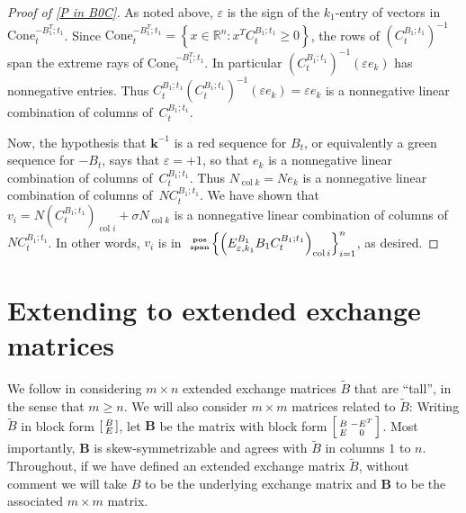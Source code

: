 \documentclass{amsart}
\theoremstyle{definition}
\theoremstyle{remark}
\numberwithin{equation}{section}
\newcommand{\reals}{\mathbb R}
\newcommand{\ep}{\varepsilon}
\newcommand{\col}{\operatorname{col}}
\newcommand{\posspan}{\!\tiny\begin{array}{c}\mathbf{pos}\\\mathbf{span}\end{array}\!\!}
\newcommand{\set}[1]{{\left\lbrace #1 \right\rbrace}}
\newcommand{\0}{{\mathbf{0}}}
\newcommand{\Cone}{\mathrm{Cone}}
\newcommand{\kk}{\mathbf{k}}
\newcommand{\tB}{{\tilde{B}}}
\newcommand{\BB}{\mathbf{B}}
\begin{document}
\begin{proof}[Proof of \cref{P in B0C}]
As noted above, $\ep$ is the sign of the $k_1$-entry of vectors in $\Cone_t^{-B_1^T;t_1}$.
Since $\Cone^{-B_1^T;t_1}_t=\set{x\in\reals^n:x^TC_t^{B_1;t_1}\ge0}$, the rows of $\left(C_t^{B_1;t_1}\right)^{-1}$ span the extreme rays of $\Cone_t^{-B_1^T;t_1}$.
In particular $\left(C_t^{B_1;t_1}\right)^{-1}(\ep e_k)$ has nonnegative entries.
Thus $C_t^{B_1;t_1}\left(C_t^{B_1;t_1}\right)^{-1}(\ep e_k)=\ep e_k$ is a nonnegative linear combination of columns of~$C_t^{B_1;t_1}$.

Now, the hypothesis that $\kk^{-1}$ is a red sequence for $B_t$, or equivalently a green sequence for $-B_t$, says that $\ep=+1$, so that $e_k$ is a nonnegative linear combination of columns of~$C_t^{B_1;t_1}$.
Thus $N_{\col k}=Ne_k$ is a nonnegative linear combination of columns of~$NC_t^{B_1;t_1}$.
We have shown that $v_i=N\left(C_t^{B_1;t_1}\right)_{\col i}+\sigma N_{\col k}$ is a nonnegative linear combination of columns of~$NC_t^{B_1;t_1}$.
In other words, $v_i$ is in $\posspan\set{\left(E^{B_1}_{\ep,k_1}B_1C_t^{B_1;t_1}\right)_{\col i}}_{i=1}^n$, as desired.
\end{proof}

\section{Extending to extended exchange matrices}
We follow \cite{FZ07} in considering $m\times n$ extended exchange matrices $\tB$ that are ``tall'', in the sense that $m\ge n$.
We will also consider $m\times m$ matrices related to $\tB$:
Writing $\tB$ in block form $\begin{bsmallmatrix}B\\E\end{bsmallmatrix}$, let $\BB$ be the matrix with block form $\begin{bsmallmatrix}B&-E^T\\E&0\end{bsmallmatrix}$.
Most importantly, $\BB$ is skew-symmetrizable and agrees with $\tB$ in columns $1$ to $n$.
Throughout, if we have defined an extended exchange matrix $\tB$, without comment we will take $B$ to be the underlying exchange matrix and $\BB$ to be the associated $m\times m$ matrix.
\end{document}
